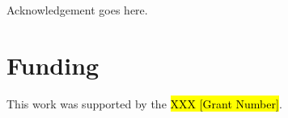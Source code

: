 \begin{acknowledgement}
Acknowledgement goes here.

\vspace{2em}
\section*{Funding} %
This work was supported by the \hl{XXX [Grant Number]}.
\end{acknowledgement}